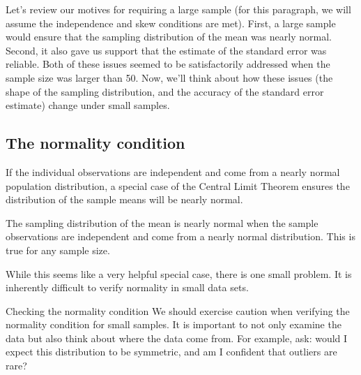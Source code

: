Let's review our motives for requiring a large sample (for this paragraph, we will assume the independence and skew conditions are met). First, a large sample would ensure that the sampling distribution of the mean was nearly normal. Second, it also gave us support that the estimate of the standard error was reliable. Both of these issues seemed to be satisfactorily addressed when the sample size was larger than 50. Now, we'll think about how these issues (the shape of the sampling distribution, and the accuracy of the standard error estimate) change under small samples.


\subsection{The normality condition}
\label{normalityCond}

If the individual observations are independent and come from a nearly normal population distribution, a special case of the Central Limit Theorem ensures the distribution of the sample means will be nearly normal.

\begin{termBox}{
The sampling distribution of the mean is nearly normal when the sample observations are independent and come from a nearly normal distribution. This is true for any sample size.}
\end{termBox}

While this seems like a very helpful special case, there is one small problem. It is inherently difficult to verify normality in small data sets.

\begin{caution}
{Checking the normality condition}
{We should exercise caution when verifying the normality condition for small samples. It is important to not only examine the data but also think about where the data come from. For example, ask: would I expect this distribution to be symmetric, and am I confident that outliers are rare?}
\end{caution}


